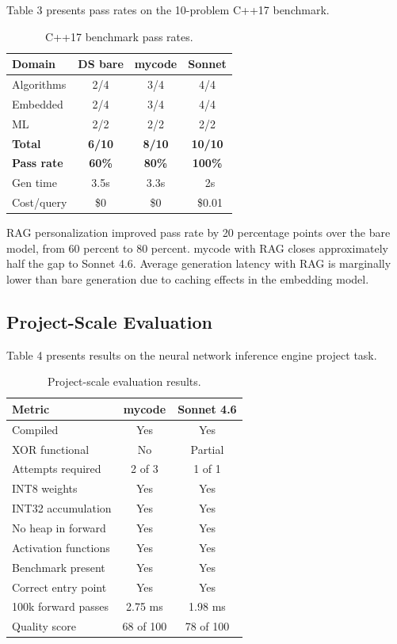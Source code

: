 \documentclass[11pt,twocolumn]{article}
\begin{document}
Table 3 presents pass rates on the 10-problem C++17 benchmark.

\begin{table}[h]
\centering
\caption{C++17 benchmark pass rates.}
\small
\begin{tabular}{p{1.4cm}ccc}
\toprule
\textbf{Domain} & \textbf{DS bare} & \textbf{mycode} & \textbf{Sonnet} \\
\midrule
Algorithms & 2/4 & 3/4 & 4/4 \\
Embedded   & 2/4 & 3/4 & 4/4 \\
ML         & 2/2 & 2/2 & 2/2 \\
\midrule
\textbf{Total}     & \textbf{6/10}  & \textbf{8/10}  & \textbf{10/10} \\
\textbf{Pass rate} & \textbf{60\%}  & \textbf{80\%}  & \textbf{100\%} \\
\midrule
Gen time   & 3.5s & 3.3s & ~2s \\
Cost/query & \$0  & \$0  & ~\$0.01 \\
\bottomrule
\end{tabular}
\end{table}

RAG personalization improved pass rate by 20 percentage points over the bare
model, from 60 percent to 80 percent. mycode with RAG closes approximately
half the gap to Sonnet 4.6. Average generation latency with RAG is marginally
lower than bare generation due to caching effects in the embedding model.

\subsection{Project-Scale Evaluation}

Table 4 presents results on the neural network inference engine project task.

\begin{table}[h]
\centering
\caption{Project-scale evaluation results.}
\begin{tabular}{lcc}
\toprule
\textbf{Metric} & \textbf{mycode} & \textbf{Sonnet 4.6} \\
\midrule
Compiled & Yes & Yes \\
XOR functional & No & Partial \\
Attempts required & 2 of 3 & 1 of 1 \\
INT8 weights & Yes & Yes \\
INT32 accumulation & Yes & Yes \\
No heap in forward & Yes & Yes \\
Activation functions & Yes & Yes \\
Benchmark present & Yes & Yes \\
Correct entry point & Yes & Yes \\
100k forward passes & 2.75 ms & 1.98 ms \\
Quality score & 68 of 100 & 78 of 100 \\
\bottomrule
\end{tabular}
\end{table}
\end{document}
